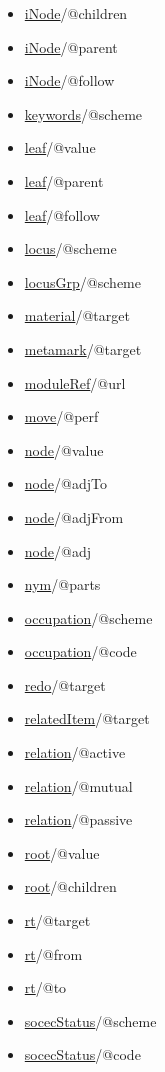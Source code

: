 \begin{reflist}
\begin{itemize}
\item \hyperref[TEI.iNode]{iNode}/@children
\item \hyperref[TEI.iNode]{iNode}/@parent
\item \hyperref[TEI.iNode]{iNode}/@follow
\item \hyperref[TEI.keywords]{keywords}/@scheme
\item \hyperref[TEI.leaf]{leaf}/@value
\item \hyperref[TEI.leaf]{leaf}/@parent
\item \hyperref[TEI.leaf]{leaf}/@follow
\item \hyperref[TEI.locus]{locus}/@scheme
\item \hyperref[TEI.locusGrp]{locusGrp}/@scheme
\item \hyperref[TEI.material]{material}/@target
\item \hyperref[TEI.metamark]{metamark}/@target
\item \hyperref[TEI.moduleRef]{moduleRef}/@url
\item \hyperref[TEI.move]{move}/@perf
\item \hyperref[TEI.node]{node}/@value
\item \hyperref[TEI.node]{node}/@adjTo
\item \hyperref[TEI.node]{node}/@adjFrom
\item \hyperref[TEI.node]{node}/@adj
\item \hyperref[TEI.nym]{nym}/@parts
\item \hyperref[TEI.occupation]{occupation}/@scheme
\item \hyperref[TEI.occupation]{occupation}/@code
\item \hyperref[TEI.redo]{redo}/@target
\item \hyperref[TEI.relatedItem]{relatedItem}/@target
\item \hyperref[TEI.relation]{relation}/@active
\item \hyperref[TEI.relation]{relation}/@mutual
\item \hyperref[TEI.relation]{relation}/@passive
\item \hyperref[TEI.root]{root}/@value
\item \hyperref[TEI.root]{root}/@children
\item \hyperref[TEI.rt]{rt}/@target
\item \hyperref[TEI.rt]{rt}/@from
\item \hyperref[TEI.rt]{rt}/@to
\item \hyperref[TEI.socecStatus]{socecStatus}/@scheme
\item \hyperref[TEI.socecStatus]{socecStatus}/@code

\end{itemize}
\end{reflist}
